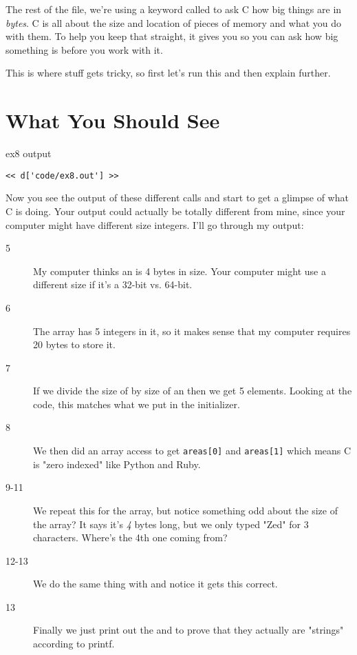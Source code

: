 The rest of the file, we're using a keyword called  to
ask C how big things are in \emph{bytes}.  C is all about the size
and location of pieces of memory and what you do with them.  To help
you keep that straight, it gives you  so you can ask
how big something is before you work with it.

This is where stuff gets tricky, so first let's run this and then
explain further.

\section{What You Should See}

\begin{code}{ex8 output}
\begin{lstlisting}
<< d['code/ex8.out'] >>
\end{lstlisting}
\end{code}

Now you see the output of these different  calls
and start to get a glimpse of what C is doing.  Your output could
actually be totally different from mine, since your computer might
have different size integers.  I'll go through my output:

\begin{description}
\item [5] My computer thinks an  is 4 bytes in size. Your computer
    might use a different size if it's a 32-bit vs. 64-bit.
\item [6] The  array has 5 integers in it, so it makes
    sense that my computer requires 20 bytes to store it.
\item [7] If we divide the size of  by size of an 
    then we get 5 elements.  Looking at the code, this matches what 
    we put in the initializer.
\item [8] We then did an array access to get \verb|areas[0]| and 
    \verb|areas[1]| which means C is "zero indexed" like Python
    and Ruby.
\item [9-11] We repeat this for the  array, but notice
    something odd about the size of the array?  It says it's 
    \emph{4} bytes long, but we only typed "Zed" for 3 characters.
    Where's the 4th one coming from?
\item [12-13] We do the same thing with  and 
    notice it gets this correct.
\item [13] Finally we just print out the  and 
    to prove that they actually are "strings" according to printf.
\end{description}

